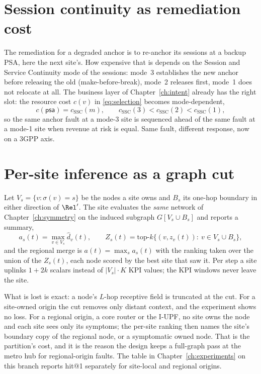 \section{Session continuity as remediation cost}
The remediation for a degraded anchor is to re-anchor its sessions at a backup PSA, here the next
site's. How expensive that is depends on the Session and Service Continuity mode of the sessions:
mode~3 establishes the new anchor before releasing the old (make-before-break), mode~2 releases
first, mode~1 does not relocate at all. The business layer of Chapter~\ref{ch:intent} already has
the right slot: the resource cost $c(v)$ in \eqref{eq:selection} becomes mode-dependent,
\begin{equation}
c(\textsf{psa})=c_{\mathrm{SSC}}(m),\qquad c_{\mathrm{SSC}}(3)<c_{\mathrm{SSC}}(2)<c_{\mathrm{SSC}}(1),
\label{eq:ssc}
\end{equation}
so the same anchor fault at a mode-3 site is sequenced ahead of the same fault at a mode-1 site
when revenue at risk is equal. Same fault, different response, now on a 3GPP axis.

\section{Per-site inference as a graph cut}
Let $V_s=\{v:\sigma(v)=s\}$ be the nodes a site owns and $B_s$ its one-hop boundary in either
direction of $\Rel'$. The site evaluates the \emph{same} network of Chapter~\ref{ch:symmetry} on
the induced subgraph $G[V_s\cup B_s]$ and reports a summary,
\begin{equation}
a_s(t)=\max_{v\in V_s}\hat d_v(t),\qquad
Z_s(t)=\text{top-}k\big\{(v,z_v(t)):\ v\in V_s\cup B_s\big\},
\label{eq:site-summary}
\end{equation}
and the regional merge is $a(t)=\max_s a_s(t)$ with the ranking taken over the union of the
$Z_s(t)$, each node scored by the best site that saw it. Per step a site uplinks $1+2k$ scalars
instead of $|V_s|\cdot K$ KPI values; the KPI windows never leave the site.

What is lost is exact: a node's $L$-hop receptive field is truncated at the cut. For a site-owned
origin the cut removes only distant context, and the experiment shows no loss. For a regional
origin, a core router or the I-UPF, no site owns the node and each site sees only its symptoms;
the per-site ranking then names the site's boundary copy of the regional node, or a symptomatic
owned node. That is the partition's cost, and it is the reason the design keeps a full-graph pass
at the metro hub for regional-origin faults. The table in Chapter~\ref{ch:experiments} on this
branch reports hit@1 separately for site-local and regional origins.

